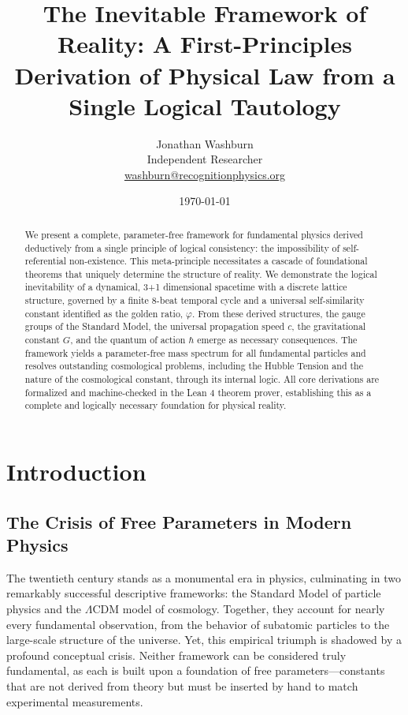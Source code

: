 \documentclass[11pt,a4paper]{article}
\title{\textbf{The Inevitable Framework of Reality: A First-Principles Derivation of Physical Law from a Single Logical Tautology}}
\author{Jonathan Washburn \\
        Independent Researcher \\
        \href{mailto:washburn@recognitionphysics.org}{washburn@recognitionphysics.org}}
\date{\today}
\begin{document}
\maketitle

\begin{abstract}
\noindent
We present a complete, parameter-free framework for fundamental physics derived deductively from a single principle of logical consistency: the impossibility of self-referential non-existence. This meta-principle necessitates a cascade of foundational theorems that uniquely determine the structure of reality. We demonstrate the logical inevitability of a dynamical, 3+1 dimensional spacetime with a discrete lattice structure, governed by a finite 8-beat temporal cycle and a universal self-similarity constant identified as the golden ratio, \(\varphi\). From these derived structures, the gauge groups of the Standard Model, the universal propagation speed \(c\), the gravitational constant \(G\), and the quantum of action \(\hbar\) emerge as necessary consequences. The framework yields a parameter-free mass spectrum for all fundamental particles and resolves outstanding cosmological problems, including the Hubble Tension and the nature of the cosmological constant, through its internal logic. All core derivations are formalized and machine-checked in the Lean 4 theorem prover, establishing this as a complete and logically necessary foundation for physical reality.
\end{abstract}

\tableofcontents
\newpage

\section{Introduction}

\subsection{The Crisis of Free Parameters in Modern Physics}
The twentieth century stands as a monumental era in physics, culminating in two remarkably successful descriptive frameworks: the Standard Model of particle physics and the \(\Lambda\)CDM model of cosmology. Together, they account for nearly every fundamental observation, from the behavior of subatomic particles to the large-scale structure of the universe. Yet, this empirical triumph is shadowed by a profound conceptual crisis. Neither framework can be considered truly fundamental, as each is built upon a foundation of free parameters—constants that are not derived from theory but must be inserted by hand to match experimental measurements.
\end{document}
